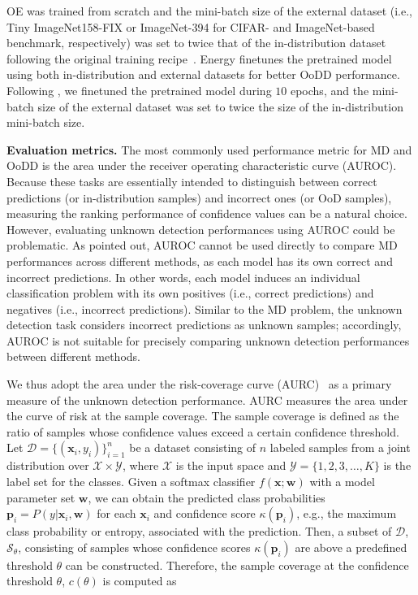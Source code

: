 \documentclass[preprint,12pt]{elsarticle}
\begin{document}
OE was trained from scratch and the mini-batch size of the external dataset (i.e., Tiny ImageNet158-FIX or ImageNet-394 for CIFAR- and ImageNet-based benchmark, respectively) was set to twice that of the in-distribution dataset following the original training recipe~\citep{hendrycks2018deep}. Energy finetunes the pretrained model using both in-distribution and external datasets for better OoDD performance. Following \cite{liu2020energy}, we finetuned the pretrained model during $10$ epochs, and the mini-batch size of the external dataset was set to twice the size of the in-distribution mini-batch size.

\textbf{Evaluation metrics.} 
The most commonly used performance metric for MD and OoDD is the area under the receiver operating characteristic curve (AUROC). Because these tasks are essentially intended to distinguish between correct predictions (or in-distribution samples) and incorrect ones (or OoD samples), measuring the ranking performance of confidence values can be a natural choice. However, evaluating unknown detection performances using AUROC could be problematic. As \cite{ashukha2020pitfalls} pointed out, AUROC cannot be used directly to compare MD performances across different methods, as each model has its own correct and incorrect predictions. In other words, each model induces an individual classification problem with its own positives (i.e., correct predictions) and negatives (i.e., incorrect predictions). Similar to the MD problem, the unknown detection task considers incorrect predictions as unknown samples; accordingly, AUROC is not suitable for precisely comparing unknown detection performances between different methods.

We thus adopt the area under the risk-coverage curve (AURC)~\citep{geifman2018bias} as a primary measure of the unknown detection performance. AURC measures the area under the curve of risk at the sample coverage. The sample coverage is defined as the ratio of samples whose confidence values exceed a certain confidence threshold. Let $\mathcal{D}=\{(\mathbf{x}_i, y_i)\}_{i=1}^{n}$ be a dataset consisting of $n$ labeled samples from a joint distribution over $\mathcal{X}\times\mathcal{Y}$, where $\mathcal{X}$ is the input space and $\mathcal{Y}=\{1,2,3, \ldots , K\}$ is the label set for the classes. Given a softmax classifier $f(\mathbf{x};\mathbf{w})$ with a model parameter set $\mathbf{w}$, we can obtain the predicted class probabilities $\mathbf{p}_i=P(y|\mathbf{x}_i, \mathbf{w})$ for each $\mathbf{x}_i$ and confidence score $\kappa(\mathbf{p}_i)$, e.g., the maximum class probability or entropy, associated with the prediction. Then, a subset of $\mathcal{D}$, $\mathcal{S}_{\theta}$, consisting of samples whose confidence scores $\kappa(\mathbf{p}_i)$ are above a predefined threshold $\theta$ can be constructed. Therefore, the sample coverage at the confidence threshold $\theta$, $c(\theta)$ is computed as
\end{document}
